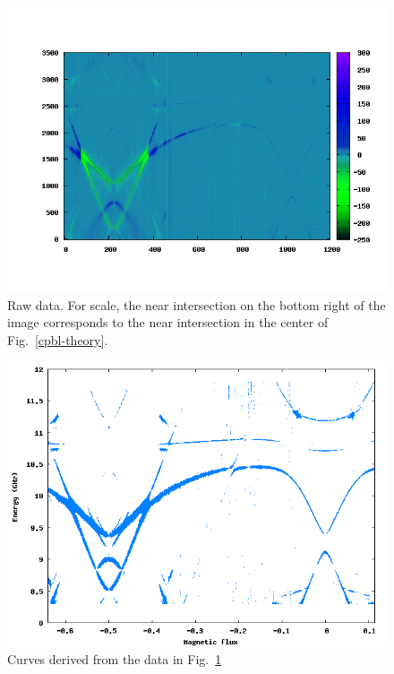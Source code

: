 \documentclass[twocolumn]{revtex4}
\begin{document}
\begin{figure}
\includegraphics[width=\linewidth]{CPBL-color.png}
\caption{ Raw data. For scale, the near intersection on the bottom
  right of the image corresponds to the near intersection in the
  center of Fig.~\ref{cpbl-theory}. }
\label{raw-2}
\end{figure}

\begin{figure}
\includegraphics[width=\linewidth]{CPBL-data.png}
\caption{ Curves derived from the data in Fig.~\ref{raw-2} }
\label{filter-2}
\end{figure}
\end{document}
